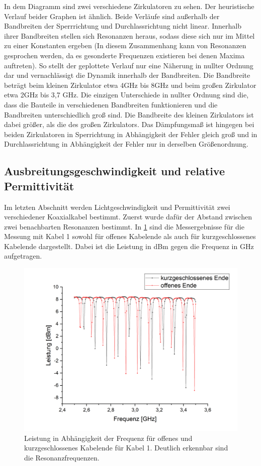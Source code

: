 In dem Diagramm sind zwei verschiedene Zirkulatoren zu sehen. Der heuristische Verlauf beider Graphen ist ähnlich. Beide Verläufe sind außerhalb der Bandbreiten der Sperrrichtung und Durchlassrichtung nicht linear. Innerhalb ihrer Bandbreiten stellen sich Resonanzen heraus, sodass diese sich nur im Mittel zu einer Konstanten ergeben (In diesem Zusammenhang kann von Resonanzen gesprochen werden, da es gesonderte Frequenzen existieren bei denen Maxima auftreten). So stellt der geplottete Verlauf nur eine Näherung in nullter Ordnung dar und vernachlässigt die Dynamik innerhalb der Bandbreiten.
Die Bandbreite beträgt beim kleinen Zirkulator etwa 4GHz bis 8GHz und beim großen Zirkulator etwa 2GHz bis 3,7 GHz. Die einzigen Unterschiede in nullter Ordnung sind die, dass die Bauteile in verschiedenen Bandbreiten funktionieren und die Bandbreiten unterschiedlich groß sind. Die Bandbreite des kleinen Zirkulators ist dabei größer, als die des großen Zirkulators. Das Dämpfungsmaß ist hingegen bei beiden Zirkulatoren in Sperrichtung in Abhängigkeit der Fehler gleich groß und in Durchlassrichtung in Abhängigkeit der Fehler nur in derselben Größenordnung.

\subsection{Ausbreitungsgeschwindigkeit und relative Permittivität}
Im letzten Abschnitt werden Lichtgeschwindigkeit und Permittivität zwei verschiedener Koaxialkabel bestimmt. Zuerst wurde dafür der Abstand zwischen zwei benachbarten Resonanzen bestimmt. In \cref{gleich} sind die Messergebnisse für die Messung mit Kabel 1 sowohl für offenes Kabelende als auch für kurzgeschlossenes Kabelende dargestellt. Dabei ist die Leistung in dBm gegen die Frequenz in GHz aufgetragen.

\begin{figure}[h]
	\centering
	\includegraphics[scale=0.6]{gleiches_Kabel.png}
	\caption{Leistung in Abhängigkeit der Frequenz für offenes und kurzgeschlossenes Kabelende für Kabel 1. Deutlich erkennbar sind die Resonanzfrequenzen.}
	\label{gleich}
\end{figure}

